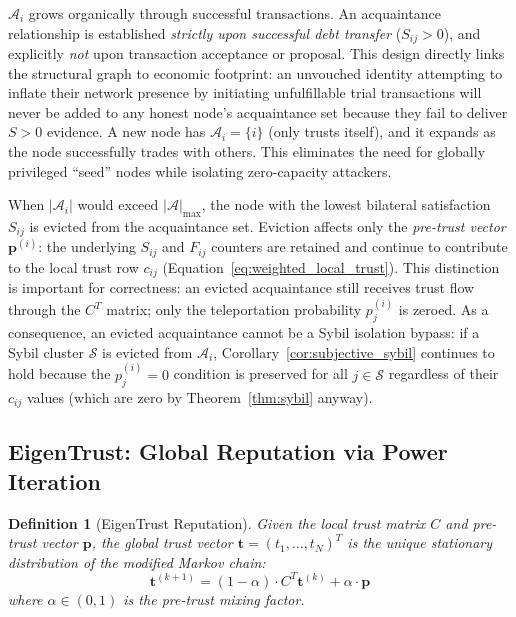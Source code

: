 \documentclass[11pt]{article}
\newtheorem{definition}[theorem]{Definition}
\begin{document}
$\mathcal{A}_i$ grows organically through successful transactions. An acquaintance relationship is established \emph{strictly upon successful debt transfer} ($S_{ij} > 0$), and explicitly \emph{not} upon transaction acceptance or proposal. This design directly links the structural graph to economic footprint: an unvouched identity attempting to inflate their network presence by initiating unfulfillable trial transactions will never be added to any honest node's acquaintance set because they fail to deliver $S > 0$ evidence. A new node has $\mathcal{A}_i = \{i\}$ (only trusts itself), and it expands as the node successfully trades with others. This eliminates the need for globally privileged ``seed'' nodes while isolating zero-capacity attackers.

When $|\mathcal{A}_i|$ would exceed $|\mathcal{A}|_{\max}$, the node with the lowest bilateral satisfaction $S_{ij}$ is evicted from the acquaintance set. Eviction affects only the \emph{pre-trust vector} $\mathbf{p}^{(i)}$: the underlying $S_{ij}$ and $F_{ij}$ counters are retained and continue to contribute to the local trust row $c_{ij}$ (Equation~\ref{eq:weighted_local_trust}). This distinction is important for correctness: an evicted acquaintance still receives trust flow through the $C^T$ matrix; only the teleportation probability $p^{(i)}_j$ is zeroed. As a consequence, an evicted acquaintance cannot be a Sybil isolation bypass: if a Sybil cluster $\mathcal{S}$ is evicted from $\mathcal{A}_i$, Corollary~\ref{cor:subjective_sybil} continues to hold because the $p^{(i)}_j = 0$ condition is preserved for all $j \in \mathcal{S}$ regardless of their $c_{ij}$ values (which are zero by Theorem~\ref{thm:sybil} anyway).

\subsection{EigenTrust: Global Reputation via Power Iteration}

\begin{definition}[EigenTrust Reputation]\label{def:eigentrust}
Given the local trust matrix $C$ and pre-trust vector $\mathbf{p}$, the global trust vector $\mathbf{t} = (t_1, \ldots, t_N)^T$ is the unique stationary distribution of the modified Markov chain:
\begin{equation}\label{eq:eigentrust}
    \mathbf{t}^{(k+1)} = (1 - \alpha) \cdot C^T \mathbf{t}^{(k)} + \alpha \cdot \mathbf{p}
\end{equation}
where $\alpha \in (0, 1)$ is the \emph{pre-trust mixing factor}.
\end{definition}
\end{document}
